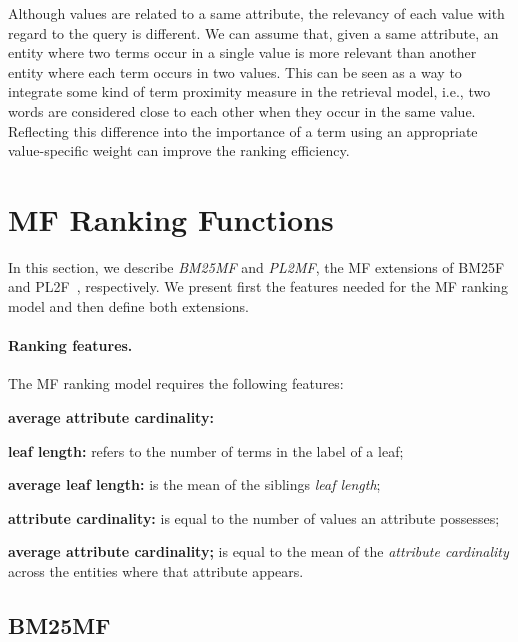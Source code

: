 Although values are related to a same attribute, the relevancy of each value with regard to the query is different. We can assume that, given a same attribute, an entity where two terms occur in a single value is more relevant than another entity where each term occurs in two values. This can be seen as a way to integrate some kind of term proximity measure in the retrieval model, i.e., two words are considered close to each other when they occur in the same value. Reflecting this difference into the importance of a term using an appropriate value-specific weight can improve the ranking efficiency.

\section{MF Ranking Functions}
\label{sec:mf-function}

In this section, we describe \emph{BM25MF} and \emph{PL2MF}, the MF extensions of BM25F~\cite{zaragoza:2004:microsoft} and PL2F~\cite{macdonald:2005:clef}, respectively.
We present first the features needed for the MF ranking model and then define both extensions.

\paragraph{Ranking features.}

The MF ranking model requires the following features:
\begin{labeling}{\textbf{average attribute cardinality:}}
  \item[\textbf{leaf length:}] refers to the number of terms in the label of a leaf;
  \item[\textbf{average leaf length:}] is the mean of the siblings \emph{leaf length};
  \item[\textbf{attribute cardinality:}] is equal to the number of values an attribute possesses;
  \item[\textbf{average attribute cardinality;}] is equal to the mean of the \emph{attribute cardinality} across the entities where that attribute appears.
\end{labeling}

\subsection{BM25MF}

